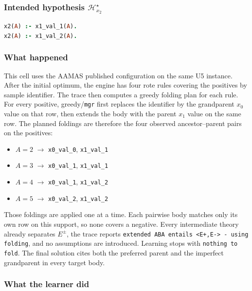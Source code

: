 \documentclass[11pt]{article}
\begin{document}
\subsubsection{\texorpdfstring{Intended hypothesis \(\mathcal{H}_{x_2}^\star\)}{Intended hypothesis H-star(x2)}}

\begin{lstlisting}[style=logic,language=Prolog]
x2(A) :- x1_val_1(A).
x2(A) :- x1_val_2(A).
\end{lstlisting}

\subsubsection{What happened}

This cell uses the AAMAS published configuration on the same U5 instance. After the initial optimum, the engine has four rote rules covering the positives by sample identifier. The trace then computes a greedy folding plan for each rule. For every positive, greedy/\texttt{mgr} first replaces the identifier by the grandparent \(x_0\) value on that row, then extends the body with the parent \(x_1\) value on the same row. The planned foldings are therefore the four observed ancestor--parent pairs on the positives:

\begin{itemize}
  \item \(A=2\) \(\rightarrow\) \texttt{x0\_val\_0}, \texttt{x1\_val\_1}
  \item \(A=3\) \(\rightarrow\) \texttt{x0\_val\_1}, \texttt{x1\_val\_1}
  \item \(A=4\) \(\rightarrow\) \texttt{x0\_val\_1}, \texttt{x1\_val\_2}
  \item \(A=5\) \(\rightarrow\) \texttt{x0\_val\_2}, \texttt{x1\_val\_2}
\end{itemize}

Those foldings are applied one at a time. Each pairwise body matches only its own row on this support, so none covers a negative. Every intermediate theory already separates \(E^\pm\), the trace reports \texttt{extended ABA entails <E+,E-> - using folding}, and no assumptions are introduced. Learning stops with \texttt{nothing to fold}. The final solution cites both the preferred parent and the imperfect grandparent in every target body.

\subsubsection{What the learner did}
\end{document}
